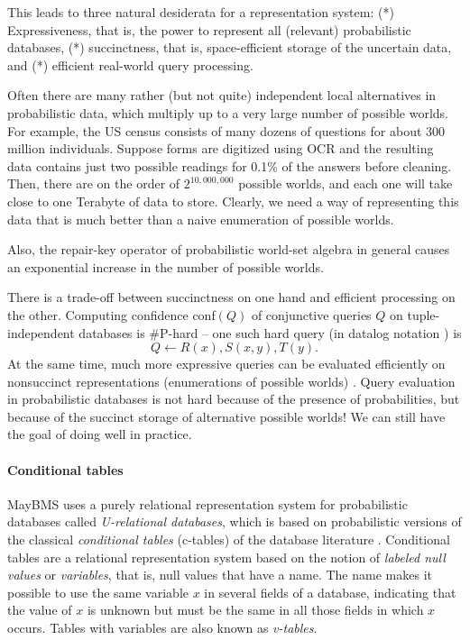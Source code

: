 This leads to three natural desiderata for a representation system:
(*) Expressiveness, that is, the power to represent all (relevant) probabilistic databases,
(*) succinctness, that is, space-efficient storage of the uncertain data,
and (*) efficient real-world query processing.

Often there are many rather (but not quite) independent
local alternatives in probabilistic data, which multiply up to a very large number of possible worlds.
For example, the US census consists of many dozens of questions for about 300 million individuals.
Suppose forms are digitized using OCR and the resulting data contains just
two possible readings for 0.1\% of the answers before cleaning.
Then, there are on the order of $2^{10,000,000}$ possible worlds, and each one will take
close to one Terabyte of data to store.
Clearly, we need a way of representing this data that is much better than a naive enumeration of possible worlds.

Also, the repair-key operator of probabilistic world-set algebra in general causes an exponential increase in the number of possible worlds.

There is a trade-off between succinctness on one hand and efficient processing on the other.
Computing confidence conf$(Q)$ of conjunctive queries $Q$ on tuple-independent databases
is \#P-hard -- one such hard query \cite{dalvi07efficient} (in datalog notation \cite{AHV95}) is
\[
Q \leftarrow R(x), S(x,y), T(y).
\]
At the same time, much more expressive queries can be evaluated efficiently on nonsuccinct representations (enumerations of possible worlds) \cite{AKO07ISQL}. Query evaluation in probabilistic databases is not hard because of the presence of probabilities, but because of the succinct storage of alternative possible worlds!
We can still have the goal of doing well in practice.


\paragraph{Conditional tables}
MayBMS uses a purely relational representation system for probabilistic databases called {\em U-relational databases}\/, which is based
on probabilistic versions of the classical {\em conditional tables}\/ (c-tables) of the database literature \cite{IL1984}.
Conditional tables are a relational representation system based on the notion of {\em labeled null values}\/ or {\em variables}\/, that is, null values that have a name. The name makes it possible to use the same variable $x$ in several fields of a database, indicating that the value of $x$ is unknown but must be the same in all those fields in which $x$ occurs. Tables with variables are also known as {\em v-tables}\/.



